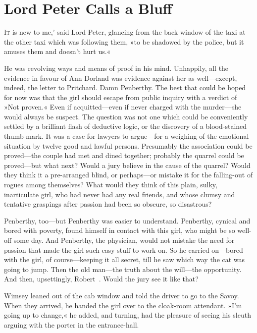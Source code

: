 \chapter{Lord Peter Calls a Bluff}

\lettrine[lines=4,ante=‘]{I}{t} is new to me,' said Lord Peter, glancing from the back window of the taxi at the other taxi which was following them, »to be shadowed by the police, but it amuses them and doesn't hurt us.«

\zz
He was revolving ways and means of proof in his mind. Unhappily, all the evidence in favour of Ann Dorland was evidence against her as well—except, indeed, the letter to Pritchard. Damn Penberthy. The best that could be hoped for now was that the girl should escape from public inquiry with a verdict of »Not proven.« Even if acquitted—even if never charged with the murder—she would always be suspect. The question was not one which could be conveniently settled by a brilliant flash of deductive logic, or the discovery of a blood-stained thumb-mark. It was a case for lawyers to argue—for a weighing of the emotional situation by twelve good and lawful persons. Presumably the association could be proved—the couple had met and dined together; probably the quarrel could be proved—but what next? Would a jury believe in the cause of the quarrel? Would they think it a pre-arranged blind, or perhaps—or mistake it for the falling-out of rogues among themselves? What would they think of this plain, sulky, inarticulate girl, who had never had any real friends, and whose clumsy and tentative graspings after passion had been so obscure, so disastrous?

Penberthy, too—but Penberthy was easier to understand. Penberthy, cynical and bored with poverty, found himself in contact with this girl, who might be so well-off some day. And Penberthy, the physician, would not mistake the need for passion that made the girl such easy stuff to work on. So he carried on—bored with the girl, of course—keeping it all secret, till he saw which way the cat was going to jump. Then the old man—the truth about the will—the opportunity. And then, upsettingly, Robert\textellipsis~. Would the jury see it like that?

Wimsey leaned out of the cab window and told the driver to go to the Savoy. When they arrived, he handed the girl over to the cloak-room attendant. »I'm going up to change,« he added, and turning, had the pleasure of seeing his sleuth arguing with the porter in the entrance-hall.


